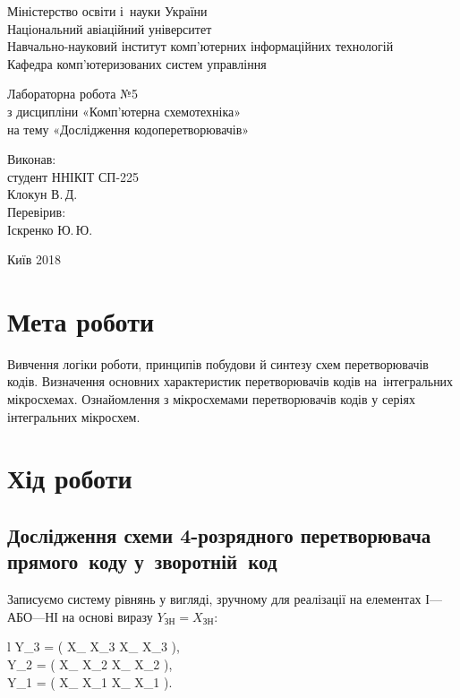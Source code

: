 \documentclass[a4paper,oneside,DIV=12,12pt,headings=normal]{scrartcl}
\begin{document}
	\begin{titlepage}
	\centering
		Міністерство освіти і~науки України\\
		Національний авіаційний університет\\
		Навчально-науковий інститут комп'ютерних інформаційних технологій\\
		Кафедра комп'ютеризованих систем управління

		\vspace*{\fill}

		Лабораторна робота №5\\
		з дисципліни «Комп'ютерна схемотехніка»\\
		на тему «Дослідження кодоперетворювачів»

		\vspace*{\fill}
		
		\begin{flushright}
			Виконав:\\
			студент ННІКІТ СП-225\\
			Клокун В.\,Д.\\
			Перевірив:\\
			Іскренко Ю.\,Ю.
		\end{flushright}

		Київ 2018
	\end{titlepage}

	\section{Мета роботи}
		Вивчення логіки роботи, принципів побудови й синтезу схем перетворювачів кодів. Визначення основних характеристик перетворювачів кодів на~інтегральних мікросхемах. Ознайомлення з мікросхемами перетворювачів кодів у серіях інтегральних мікросхем.

	\section{Хід роботи}
		\subsection{Дослідження схеми 4-розрядного перетворювача прямого~коду у~зворотній~код}
			Записуємо систему рівнянь у вигляді, зручному для реалізації на елементах І—АБО—НІ на основі виразу $Y_{\text{ЗН}} = X_{\text{ЗН}}$:
			\begin{IEEEeqnarray*}{l}
				Y_3 = \neg \left( X_{} \land X_3 \lor \neg X_{} \land \neg X_3 \right), \\
				Y_2 = \neg \left( X_{} \land X_2 \lor \neg X_{} \land \neg X_2 \right), \\
				Y_1 = \neg \left( X_{} \land X_1 \lor \neg X_{} \land \neg X_1 \right).
			\end{IEEEeqnarray*}
\end{document}

